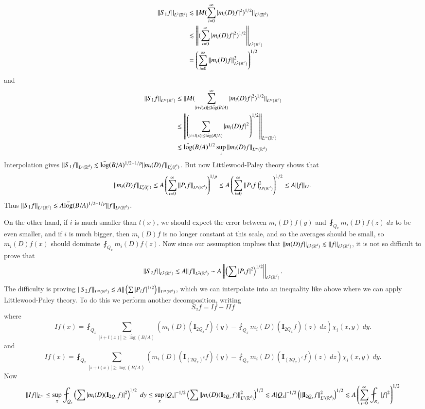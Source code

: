 %
\begin{align*}
    \| S_1 f \|_{L^2(\operatorname{\mathbb{R}}^d)} &\lesssim \| M(\sum_{i = 0}^\infty |m_i(D) f|^2)^{1/2} \|_{L^2(\operatorname{\mathbb{R}}^d)}\\
    &\lesssim \left\| (\sum_{i = 0}^\infty |m_i(D) f|^2 )^{1/2} \right\|_{L^2(\operatorname{\mathbb{R}}^d)}\\
    &= \left( \sum_{i = 0}^\infty \| m_i(D) f \|_{L^2(\operatorname{\mathbb{R}}^d)}^2 \right)^{1/2}
\end{align*}
%
and
%
\begin{align*}
    \| S_1 f \|_{L^\infty(\operatorname{\mathbb{R}}^d)} &\leq \| M(\sum_{|i + l(x)| \leq \tilde{\log}(B/A)}^\infty |m_i(D) f|^2)^{1/2} \|_{L^\infty(\operatorname{\mathbb{R}}^d)}\\
    &\leq \left\| \left( \sum_{|i + l(x)| \leq \tilde{\log}(B/A)} |m_i(D) f|^2 \right)^{1/2} \right\|_{L^\infty(\operatorname{\mathbb{R}}^d)}\\
    &\lesssim \tilde{\log}(B/A)^{1/2} \sup_i  \| m_i(D) f \|_{L^\infty(\operatorname{\mathbb{R}}^d)}
\end{align*}
%
Interpolation gives $\| S_1 f \|_{L^p(\operatorname{\mathbb{R}}^d)} \lesssim \tilde{\log}(B/A)^{1/2 - 1/p} \| m_i(D) f \|_{L^p_x(l^p_i)}$. But now Littlewood-Paley theory shows that
%
\[ \| m_i(D) f \|_{L^p_x(l^p_i)} \leq A \left( \sum_{i = 0}^\infty \| P_i f \|_{L^p(\operatorname{\mathbb{R}}^d)} \right)^{1/p} \leq A \left( \sum_{i = 0}^\infty \| P_i f \|_{L^p(\operatorname{\mathbb{R}}^d)}^2 \right)^{1/2} \lesssim A \| f \|_{L^p}. \]
%
Thus $\| S_1 f \|_{L^p(\operatorname{\mathbb{R}}^d)} \lesssim A \tilde{\log}(B/A)^{1/2 - 1/p} \| f \|_{L^p(\operatorname{\mathbb{R}}^d)}$.

On the other hand, if $i$ is much smaller than $l(x)$, we should expect the error between $m_i(D) f(y)$ and $\fint_{Q_x} m_i(D) f(z)\; dz$ to be even smaller, and if $i$ is much bigger, then $m_i(D) f$ is no longer constant at this scale, and so the averages should be small, so $m_i(D) f(x)$ should dominate $\fint_{Q_x} m_i(D) f(z)$. Now since our assumption implues that $\| m(D) f \|_{L^2(\operatorname{\mathbb{R}}^d)} \lesssim \| f \|_{L^2(\operatorname{\mathbb{R}}^d)}$, it is not so difficult to prove that
%
\[ \| S_2 f \|_{L^2(\operatorname{\mathbb{R}}^d)} \lesssim A \| f \|_{L^2(\operatorname{\mathbb{R}}^d)} \sim A \left\| \left( \sum |P_i f|^2 \right)^{1/2} \right\|_{L^2(\operatorname{\mathbb{R}}^d)}. \]
%
The difficulty is proving $\| S_2 f \|_{L^\infty(\operatorname{\mathbb{R}}^d)} \lesssim A \| \left( \sum |P_i f|^{1/2} \right) \|_{L^\infty(\operatorname{\mathbb{R}}^d)}$, which we can interpolate into an inequality like above where we can apply Littlewood-Paley theory. To do this we perform another decomposition, writing
%
\[ S_2 f = I f + {II}f \]
%
where
%
\[ If(x) = \fint_{Q_x} \sum_{|i + l(x)| \geq \tilde\log(B/A)} \left( m_i(D) (\mathbf{I}_{2Q_x}f)(y) - \fint_{Q_x} m_i(D)(\mathbf{I}_{2Q_x} f)(z)\; dz \right) \chi_i(x,y)\; dy. \]
%
and
%
\[ If(x) = \fint_{Q_x} \sum_{|i + l(x)| \geq \tilde\log(B/A)} \left( m_i(D) (\mathbf{I}_{(2Q_x)^c}f)(y) - \fint_{Q_x} m_i(D)(\mathbf{I}_{(2Q_x)^c} f)(z)\; dz \right) \chi_i(x,y)\; dy. \]
%
Now
%
\[ \|If \|_{L^\infty} \leq \sup_x \fint_{Q_x} \left( \sum | m_i(D) (\mathbf{I}_{2Q_x} f) |^2 \right)^{1/2}\; dy \leq \sup_x |Q_x|^{-1/2} \left( \sum \| m_i(D) (\mathbf{I}_{2Q_x} f) \|_{L^2(\RR^d)}^2 \right)^{1/2} \lesssim A |Q_x|^{-1/2} \left( \| \mathbf{I}_{2Q_x} f \|_{L^2(\RR^d)}^2 \right)^{1/2} \lesssim A \left( \sum_{i = 0}^\infty \fint_{R_x} |f|^2 \right)^{1/2} \]





